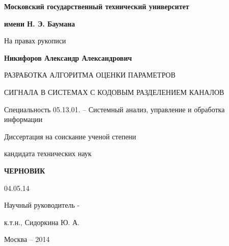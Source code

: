 \noindent\centerline{\bf{Московский государственный технический университет}}
\noindent\centerline{\bf{имени Н. Э. Баумана}}
\vspace{\baselineskip}
\vspace{\baselineskip}

\hfill На правах рукописи

\vspace{\baselineskip}
\vspace{\baselineskip}

\noindent\centerline{\bf{Никифоров Александр Александрович}}

\vspace{\baselineskip}
\vspace{\baselineskip}

\noindent\centerline{РАЗРАБОТКА АЛГОРИТМА ОЦЕНКИ ПАРАМЕТРОВ}
\noindent\centerline{СИГНАЛА В СИСТЕМАХ С КОДОВЫМ РАЗДЕЛЕНИЕМ КАНАЛОВ}

\vspace{\baselineskip}
\vspace{\baselineskip}

\noindent\centerline{Специальность 05.13.01. – Системный анализ, управление и обработка информации}

\vspace{\baselineskip}
\vspace{\baselineskip}

\noindent\centerline{Диссертация на соискание ученой степени}
\noindent\centerline{кандидата технических наук}


\vspace{\baselineskip}
\vspace{\baselineskip}
\noindent\centerline{\bf{ЧЕРНОВИК}}
\noindent\centerline{04.05.14}

\vspace{\baselineskip}
\vspace{\baselineskip}

\hfill{Научный руководитель -}

\hfill{к.т.н., Сидоркина Ю. А.}

\vfill
\noindent\centerline{Москва – 2014}

\newpage
